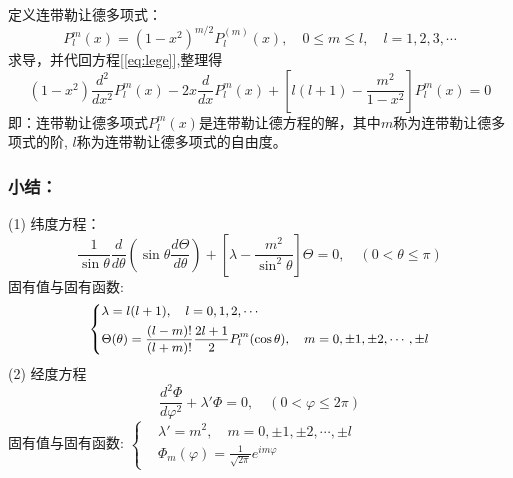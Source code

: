\begin{frame}[label=current]
\frametitle{}
定义连带勒让德多项式： $$ \boxed{P^{m} _l(x)=(1-x^2)^{m/2}P^{(m)} _l(x), \quad 0\le m\le l, \quad l=1,2,3,\cdots} $$
求导，并代回方程[\ref{eq:lege}],整理得
\begin{equation*}
  \left(1-x^{2}\right) \frac{d^{2}}{d x^{2}} P^m_{l}(x) -2 x \frac{d}{d x} P^m_{l}(x)+\left[l(l+1)-\frac{m^{2}}{1-x^{2}}\right] P^m_{l}(x)=0
\end{equation*}		
即：连带勒让德多项式$P^m _{l}(x)$是连带勒让德方程的解，其中$m$称为连带勒让德多项式的阶, $l$称为连带勒让德多项式的自由度。
\end{frame} 

\begin{frame}[label=current]
\frametitle{小结：}
(1) 纬度方程：
{\small \begin{equation*}
\frac{1}{\sin \theta} \frac{d}{d \theta}\left(\sin \theta \frac{d \Theta}{d \theta}\right)+\left[\lambda-\frac{m^{2}}{\sin ^{2} \theta}\right] \Theta=0, \quad (0< \theta \le \pi)
\end{equation*}}	
固有值与固有函数: 
 $$ \small \left\{
 \begin{aligned}
&\lambda = l (l+1), \quad l =0,1,2,\cdots \\
&\Theta (\theta) = \frac{(l-m)!} {(l+m)!} \frac{2l+1}{2} P^m _{l}(\cos\theta) ,\quad m = 0, \pm 1, \pm 2, \cdots , \pm l  
 \end{aligned} \right. $$ 
(2) 经度方程 
\begin{equation*}
\frac{d^{2} \Phi}{d \varphi^{2}}+\lambda' \Phi=0,\quad (0<\varphi\le2 \pi)
\end{equation*}
固有值与固有函数:
 $ \left\{
 \begin{aligned}
&\lambda' = m^2,\quad m = 0, \pm 1, \pm 2, \cdots , \pm l \\
&\Phi_m (\varphi)=\frac{1}{\sqrt{2\pi}} e^{im\varphi}  
 \end{aligned} \right. $
\end{frame} 


